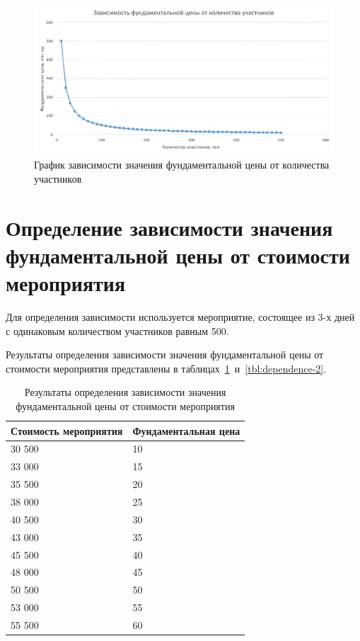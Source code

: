 \begin{figure}[H]
	\centering
	\includegraphics[width=1\textwidth]{images/dependency-1.png}
	\caption{График зависимости значения фундаментальной цены от количества участников} 
	\label{fig:dependency-1} 
\end{figure}

\section{Определение зависимости значения фундаментальной цены от стоимости мероприятия}

Для определения зависимости используется мероприятие, состоящее из 3-х дней с одинаковым количеством участников равным 500.

Результаты определения зависимости значения фундаментальной цены от стоимости мероприятия представлены в таблицах~\ref{tbl:short-dependence-2}~и~\ref{tbl:dependence-2}.

\begin{table}[H]
	\centering
	\caption{Результаты определения зависимости значения фундаментальной цены от стоимости мероприятия}
	\label{tbl:short-dependence-2}
	\begin{tabularx}{\textwidth}{|X|X|}
		\hline
		\textbf{Стоимость мероприятия} & \textbf{Фундаментальная цена} \\
		\hline
		30 500 & 10 \\ \hline
		33 000 & 15 \\ \hline
		35 500 & 20 \\ \hline
		38 000 & 25 \\ \hline
		40 500 & 30 \\ \hline
		43 000 & 35 \\ \hline
		45 500 & 40 \\ \hline
		48 000 & 45 \\ \hline
		50 500 & 50 \\ \hline
		53 000 & 55 \\ \hline
		55 500 & 60 \\ \hline
	\end{tabularx}
\end{table}

